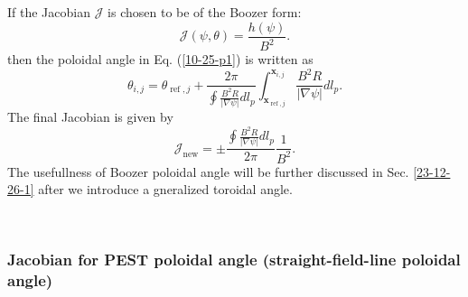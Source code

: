 \documentclass{llncs}
\newcommand{\tmop}[1]{\ensuremath{\operatorname{#1}}}
\begin{document}
If the Jacobian $\mathcal{J}$ is chosen to be of the Boozer form:
\begin{equation}
  \mathcal{J} (\psi, \theta) = \frac{h (\psi)}{B^2} .
\end{equation}
then the poloidal angle in Eq. (\ref{10-25-p1}) is written as
\begin{equation}
  \theta_{i, j} = \theta_{\tmop{ref}, j} + \frac{2 \pi}{\oint \frac{B^2 R}{|
  \nabla \psi |} d l_p} \int_{\mathbf{x}_{\tmop{ref}, j}}^{\mathbf{x}_{i, j}}
  \frac{B^2 R}{| \nabla \psi |} d l_p .
\end{equation}
The final Jacobian is given by
\begin{equation}
  \mathcal{J}_{\tmop{new}} = \pm \frac{\oint \frac{B^2 R}{| \nabla \psi |} d
  l_p}{2 \pi}  \frac{1}{B^2} .
\end{equation}
The usefullness of Boozer poloidal angle will be further discussed in Sec.
\ref{23-12-26-1} after we introduce a gneralized toroidal angle.

\

\subsubsection{Jacobian for PEST poloidal angle (straight-field-line poloidal
angle)}\label{17-10-30-1}
\end{document}
